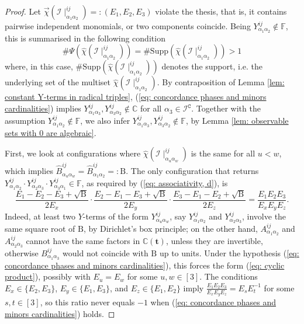 \documentclass[10pt]{article}
\theoremstyle{remark}%
\theoremstyle{definition}%
\begin{document}
\begin{proof}
Let $\overrightarrow{\chi}(\mathcal{I}\mid_{\alpha_{1}\alpha_{2}}^{ij})=:(E_{1},E_{2},E_{3})$ violate the thesis, that is, it contains pairwise independent monomials, or two components coincide. Being $Y_{\alpha_{1}\alpha_{2}}^{ij}\notin\mathbb{F}$, this is summarised in the following condition  
 \begin{equation}
\#\Psi(\hat{\chi}(\mathcal{I}\mid_{\alpha_{1}\alpha_{2}}^{ij}))=\#\mathrm{Supp}(\hat{\chi}(\mathcal{I}\mid_{\alpha_{1}\alpha_{2}}^{ij}))>1
\label{eq: concordance phases and minors cardinalities}
 \end{equation}
where, in this case, $\#\mathrm{Supp}(\hat{\chi}(\mathcal{I}\mid_{\alpha_{1}\alpha_{2}}^{ij}))$ denotes the support, i.e. the underlying set of the multiset $\hat{\chi}(\mathcal{I}\mid_{\alpha_{1}\alpha_{2}}^{ij})$. By contraposition of Lemma \ref{lem: constant Y-terms in radical triples}, (\ref{eq: concordance phases and minors cardinalities}) implies $Y_{\alpha_{1}\alpha_{3}}^{ij},Y_{\alpha_{3}\alpha_{2}}^{ij}\notin\mathbb{C}$ for all $\alpha_{3}\in \mathcal{I}^{\mathtt{C}}$. Together with the assumption $Y_{\alpha_{1}\alpha_{2}}^{ij}\notin\mathbb{F}$, we also infer $Y_{\alpha_{1}\alpha_{3}}^{ij},Y_{\alpha_{3}\alpha_{2}}^{ij}\notin\mathbb{F}$, by Lemma \ref{lem: observable sets with 0 are algebraic}. 

First, we look at configurations where $\hat{\chi}(\mathcal{I}\mid_{\alpha_{u}\alpha_{w}}^{ij})$ is the same for all $u<w$, which implies $\hat{B}_{\alpha_{u}\alpha_{w}}^{ij}=\hat{B}_{\alpha_{1}\alpha_{2}}^{ij}=:\mathrm{B}$. The only configuration that returns $Y_{\alpha_{1}\alpha_{2}}^{ij} \cdot Y_{\alpha_{2}\alpha_{3}}^{ij}\cdot Y_{\alpha_{3}\alpha_{1}}^{ij}\in\mathbb{F}$,
as required by (\ref{eq: associativity, d}), is 
 \begin{equation}
 \frac{E_{1}-E_{2}-E_{3}+\sqrt{\mathrm{B}}}{2E_{x}}\cdot\frac{E_{2}-E_{1}-E_{3} +\sqrt{\mathrm{B}}}{2E_{y}}\cdot\frac{E_{3}-E_{1}-E_{2}+\sqrt{\mathrm{B}}}{2E_{z}} 
= \frac{E_{1}E_{2}E_{3}}{E_{x}E_{y}E_{z}}.
\label{eq: cyclic product}
 \end{equation}
Indeed, at least two $Y$-terms of the form  $Y_{\alpha_{u}\alpha_{w}}^{ij}$, say  $Y_{\alpha_{1}\alpha_{2}}^{ij}$ and $Y_{\alpha_{2}\alpha_{3}}^{ij}$, involve the same square root of $\mathrm{B}$, by Dirichlet's box principle; on the other hand, $A_{\alpha_{1}\alpha_{2}}^{ij}$ and $A_{\alpha_{2}\alpha_{3}}^{ij}$ cannot have the same factors in $\mathbb{C}(\mathbf{t})$, unless they are invertible, otherwise $B_{\alpha_{1}\alpha_{3}}^{ij}$ would not coincide with $\mathrm{B}$ up to units. Under the hypothesis (\ref{eq: concordance phases and minors cardinalities}), this forces the form (\ref{eq: cyclic product}), possibly with $E_{u}=E_{w}$ for some $u,w\in[3]$. The conditions $E_{x}\in\{E_{2},E_{3}\}$, $E_{y}\in\{E_{1},E_{3}\}$,
and $E_{z}\in\{E_{1},E_{2}\}$ imply $\frac{E_{1}E_{2}E_{3}}{E_{x}E_{y}E_{z}}=E_{s}E_{t}^{-1}$ for some $s,t\in[3]$, so this ratio never equals $-1$ when (\ref{eq: concordance phases and minors cardinalities}) holds. 


\end{proof}
\end{document}
